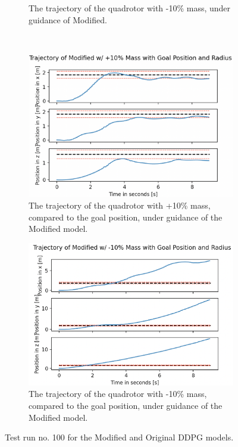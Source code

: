 \begin{figure}[H]
\begin{subfigure}[b]{0.48\textwidth}
         \caption{The trajectory of the quadrotor with -10\% mass, under guidance of Modified.}
         \label{fig:ddpg_test_robust-10-1}
     \end{subfigure} 
     \hfill \\[10mm]
     \begin{subfigure}[b]{0.49\textwidth}
         \centering
         \captionsetup{justification=centering}
         \includegraphics[width=\textwidth]{figures/5_/Testing/ddpg_test_robust+10-2.png}
         \caption{The trajectory of the quadrotor with +10\% mass, compared to the goal position, under guidance of the Modified model.}
         \label{fig:ddpg_test_robust+10-2}
     \end{subfigure} 
     \hfill 
     \begin{subfigure}[b]{0.49\textwidth}
         \centering
         \captionsetup{justification=centering}
         \includegraphics[width=\textwidth]{figures/5_/Testing/ddpg_test_robust-10-2.png}
         \caption{The trajectory of the quadrotor with -10\% mass, compared to the goal position, under guidance of the Modified model.}
         \label{fig:ddpg_test_robust-10-2}
     \end{subfigure} 
    \captionsetup{justification=centering}
    \caption{Test run no. 100 for the Modified and Original DDPG models.}
     \label{fig:ddpg_test_robust}
\end{figure}
